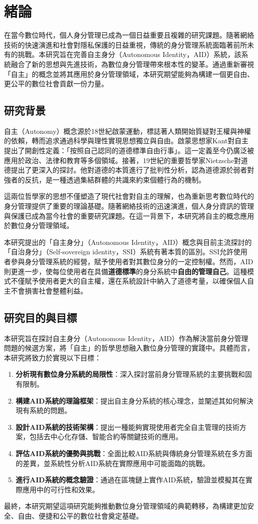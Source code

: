 
\chapter{緒論}
在當今數位時代，個人身分管理已成為一個日益重要且複雜的研究課題。隨著網絡技術的快速演進和社會對隱私保護的日益重視，傳統的身分管理系統面臨著前所未有的挑戰。本研究旨在完善自主身分（Autonomous Identity，AID）系統，該系統融合了新的思想與先進技術，為數位身分管理帶來根本性的變革。通過重新審視「自主」的概念並將其應用於身分管理領域，本研究期望能夠為構建一個更自由、更公平的數位社會貢獻一份力量。
\section{研究背景}
自主（Autonomy）概念源於18世紀啟蒙運動，標誌著人類開始質疑對王權與神權的依賴，轉而追求通過科學與理性實現思想獨立與自由。啟蒙思想家Kant\cite{kant1785groundwork}對自主提出了開創性定義：「按照自己認同的道德標準自由行事」。這一定義至今仍廣泛被應用於政治、法律和教育等多個領域。接著，19世紀的重要哲學家Nietzsche\cite{nietzsche1887genealogy}對道德提出了更深入的探討。他對道德的本質進行了批判性分析，認為道德源於弱者對強者的反抗，是一種透過集結群體的共識來約束個體行為的機制。

這兩位哲學家的思想不僅塑造了現代社會對自主的理解，也為重新思考數位時代的身分管理提供了重要的理論基礎。隨著網絡技術的迅速演進，個人身分資訊的管理與保護已成為當今社會的重要研究課題。在這一背景下，本研究將自主的概念應用於數位身分管理領域。

本研究提出的「自主身分」（Autonomous Identity，AID）概念與目前主流探討的「自治身分」（Self-sovereign identity，SSI）系統有著本質的區別。SSI允許使用者參與身分管理系統的經營，賦予使用者對其數位身分的一定控制權。然而，AID則更進一步，使每位使用者在具備\textbf{道德標準}的身分系統中\textbf{自由的管理自己}。這種模式不僅賦予使用者更大的自主權，還在系統設計中納入了道德考量，以確保個人自主不會損害社會整體利益。
\section{研究目的與目標}
本研究旨在探討自主身分（Autonomous Identity，AID）作為解決當前身分管理問題的候選方案，將「自主」的哲學思想融入數位身分管理的實踐中。具體而言，本研究將致力於實現以下目標：
\begin{enumerate}
  \item \textbf{分析現有數位身分系統的局限性}：深入探討當前身分管理系統的主要挑戰和固有限制。
  \item \textbf{構建AID系統的理論框架}：提出自主身分系統的核心理念，並闡述其如何解決現有系統的問題。
  \item \textbf{設計AID系統的技術架構}：提出一種能夠實現使用者完全自主管理的技術方案，包括去中心化存儲、智能合約等關鍵技術的應用。
  \item \textbf{評估AID系統的優勢與挑戰}：全面比較AID系統與傳統身分管理系統在多方面的差異，並系統性分析AID系統在實際應用中可能面臨的挑戰。
  \item \textbf{進行AID系統的概念驗證}：通過在區塊鏈上實作AID系統，驗證並模擬其在實際應用中的可行性和效果。
\end{enumerate}
最終，本研究期望這項研究能夠推動數位身分管理領域的典範轉移，為構建更加安全、自由、便捷和公平的數位社會奠定基礎。
